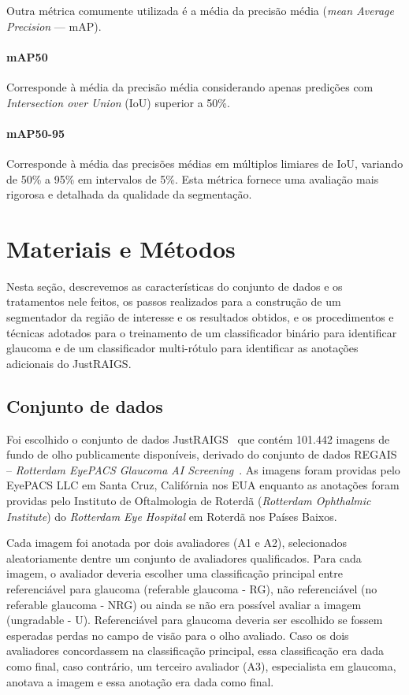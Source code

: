 \documentclass[12pt]{article}
\begin{document}
Outra métrica comumente utilizada é a média da precisão média (\emph{mean Average Precision} — mAP).

\paragraph{mAP50} Corresponde à média da precisão média considerando apenas predições com \emph{Intersection over Union} (IoU) superior a 50\%.

\paragraph{mAP50-95}  
Corresponde à média das precisões médias em múltiplos limiares de IoU, variando de 50\% a 95\% em intervalos de 5\%. Esta métrica fornece uma avaliação mais rigorosa e detalhada da qualidade da segmentação.


\section{Materiais e Métodos}
\label{sec:methodology}

Nesta seção, descrevemos as características do conjunto de dados e os tratamentos nele feitos, os passos realizados para a construção de um segmentador da região de interesse e os resultados obtidos, e os procedimentos e técnicas adotados para o treinamento de um classificador binário para identificar glaucoma e de um classificador multi-rótulo para identificar as anotações adicionais do JustRAIGS.

\subsection{Conjunto de dados}
\label{sec:dataset}

Foi escolhido o conjunto de dados JustRAIGS~\cite{justraigs} que contém 101.442 imagens de fundo de olho publicamente disponíveis, derivado do conjunto de dados REGAIS – \emph{Rotterdam EyePACS Glaucoma AI Screening}~\cite{justraigs_article}. As imagens foram providas pelo EyePACS LLC em Santa Cruz, Califórnia nos EUA enquanto as anotações foram providas pelo Instituto de Oftalmologia de Roterdã (\emph{Rotterdam Ophthalmic Institute}) do \emph{Rotterdam Eye Hospital} em Roterdã nos Países Baixos.

Cada imagem foi anotada por dois avaliadores (A1 e A2), selecionados aleatoriamente dentre um conjunto de avaliadores qualificados. 
Para cada imagem, o avaliador deveria escolher uma classificação principal entre referenciável para glaucoma (referable glaucoma - RG), não referenciável (no referable glaucoma - NRG) ou ainda se não era possível avaliar a imagem (ungradable - U). Referenciável para glaucoma deveria ser escolhido se fossem esperadas perdas no campo de visão para o olho avaliado.
Caso os dois avaliadores concordassem na classificação principal, essa classificação era dada como final, caso contrário, um terceiro avaliador (A3), especialista em glaucoma, anotava a imagem e essa anotação era dada como final.~\cite{justraigs_article}
\end{document}

